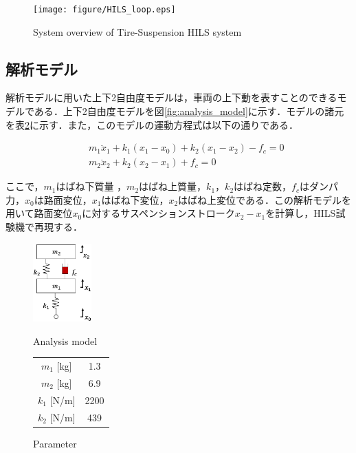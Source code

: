 \documentclass{article_vdlab_sotsuron_youshi}
\begin{document}
\vspace*{3mm}
\begin{figure}[H]
  \begin{center}
    \texttt{[image: figure/HILS\_loop.eps]}
    \vspace*{-1mm}
    \caption{System overview of Tire-Suspension HILS system}
    \label{fig:HILS}
  \end{center}
\end{figure}

\newpage
\subsection{解析モデル}
解析モデルに用いた上下2自由度モデルは，車両の上下動を表すことのできるモデルである\cite{2dof}．上下2自由度モデルを図\ref{fig:analysis_model}に示す．モデルの諸元を表\ref{tab:parameter}に示す．また，このモデルの運動方程式は以下の通りである．

\noindent
\begin{eqnarray}
 \label{eq:2dof_m1} &&m_1\ddot x_1 + k_1(x_1-x_0) + k_2(x_1-x_2) - f_c = 0\\
 \label{eq:2dof_m2} &&m_2\ddot x_2 + k_2(x_2-x_1) + f_c = 0
\end{eqnarray}

ここで，$m_1$はばね下質量 ，$m_2$はばね上質量，$k_1$，$k_2$はばね定数，$f_c$はダンパ力，$x_0$は路面変位，$x_1$はばね下変位，$x_2$はばね上変位である．この解析モデルを用いて路面変位$x_0$に対するサスペンションストローク$x_2-x_1$を計算し，HILS試験機で再現する．

\begin{figure}[H]
  \begin{minipage}{0.5\hsize}
    \begin{center}
      \includegraphics[height=30mm]{figure/analysis_model.eps}
      \caption{Analysis model}
    \label{fig:analysis_model}
    \end{center}
  \end{minipage}
  \begin{minipage}{0.35\hsize}
      \begin{center}
	\makeatletter
	\def\@captype{table}
	\makeatother
	\caption{Parameter}
	\label{tab:parameter}
	  \begin{tabular}{cc}\hline
	    $m_1$ [kg] & 1.3\\
	    $m_2$ [kg] & 6.9\\
	    $k_1$ [N/m] & 2200\\
	    $k_2$ [N/m] & 439\\\hline
	  \end{tabular}
      \end{center}
  \end{minipage}
\end{figure}
\end{document}
